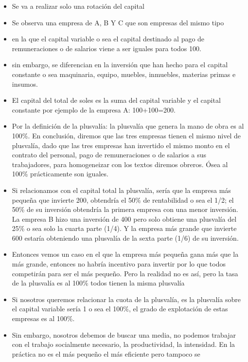 \documentclass[
  a4paper,
]{article}
\begin{document}
\begin{itemize}
\item
  Se va a realizar solo una rotación del capital
\item
  Se observa una empresa de A, B Y C que son empresas del mismo tipo
\item
  en la que el capital variable o sea el capital destinado al pago de
  remuneraciones o de salarios viene a ser iguales para todos 100.
\item
  sin embargo, se diferencian en la inversión que han hecho para el
  capital constante o sea maquinaria, equipo, muebles, inmuebles,
  materias primas e insumos.
\item
  El capital del total de soles es la suma del capital variable y el
  capital constante por ejemplo de la empresa A: 100+100=200.
\item
  Por la definición de la plusvalía: la plusvalía que genera la mano de
  obra es al 100\%. En conclusión, diremos que las tres empresas tienen
  el mismo nivel de plusvalía, dado que las tres empresas han invertido
  el mismo monto en el contrato del personal, pago de remuneraciones o
  de salarios a sus trabajadores, para homogeneizar con los textos
  diremos obreros. Ósea al 100\% prácticamente son iguales.
\item
  Si relacionamos con el capital total la plusvalía, sería que la
  empresa más pequeña que invierte 200, obtendría el 50\% de
  rentabilidad o sea el 1/2; el 50\% de su inversión obtendría la
  primera empresa con una menor inversión. La empresa B hizo una
  inversión de 400 pero solo obtiene una plusvalía del 25\% o sea solo
  la cuarta parte (1/4). Y la empresa más grande que invierte 600
  estaría obteniendo una plusvalía de la sexta parte (1/6) de su
  inversión.
\item
  Entonces vemos un caso en el que la empresa más pequeña gana más que
  la más grande, entonces no habría incentivo para invertir por lo que
  todos competirán para ser el más pequeño. Pero la realidad no es así,
  pero la tasa de la plusvalía es al 100\% todos tienen la misma
  plusvalía
\item
  Si nosotros queremos relacionar la cuota de la plusvalía, es la
  plusvalía sobre el capital variable sería 1 o sea el 100\%, el grado
  de explotación de estas empresas es al 100\%.
\item
  Sin embargo, nosotros debemos de buscar una media, no podemos trabajar
  con el trabajo socialmente necesario, la productividad, la intensidad.
  En la práctica no es el más pequeño el más eficiente pero tampoco se

\end{itemize}
\end{document}
